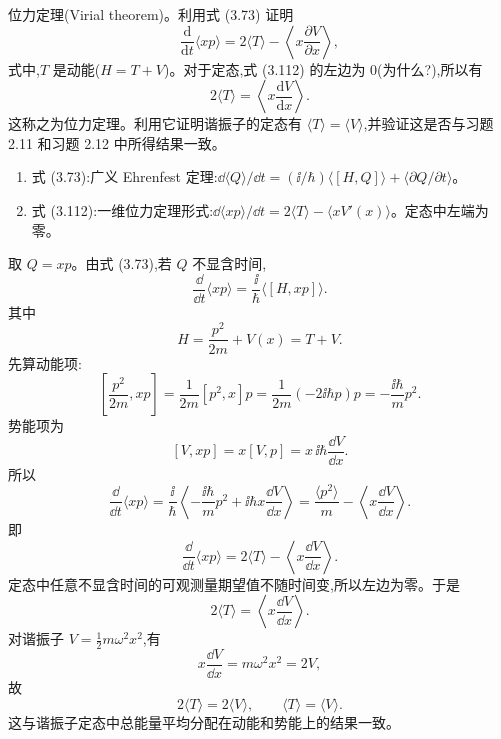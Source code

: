 \begin{question}
位力定理(Virial theorem)。利用式 (3.73) 证明
\[
\frac{\mathrm d}{\mathrm dt}\langle xp\rangle=2\langle T\rangle-\left\langle x\frac{\partial V}{\partial x}\right\rangle,
\tag{3.112}
\]
式中,$T$ 是动能($H=T+V$)。对于定态,式 (3.112) 的左边为 0(为什么?),所以有
\[
2\langle T\rangle=\left\langle x\frac{\mathrm dV}{\mathrm dx}\right\rangle .
\tag{3.113}
\]
这称之为位力定理。利用它证明谐振子的定态有 $\langle T\rangle=\langle V\rangle$,并验证这是否与习题 2.11 和习题 2.12 中所得结果一致。

\par\smallskip
{}
\begin{enumerate}[leftmargin=2.2em,itemsep=0.12em,topsep=0.12em,parsep=0pt]
\item 式 (3.73):广义 Ehrenfest 定理:$\dd\langle Q\rangle/\dd t=(\ii/\hbar)\langle[H,Q]\rangle+\langle\partial Q/\partial t\rangle$。
\item 式 (3.112):一维位力定理形式:$\dd\langle xp\rangle/\dd t=2\langle T\rangle-\langle xV'(x)\rangle$。定态中左端为零。
\end{enumerate}

\end{question}
\begin{solution}
取 $Q=xp$。由式 (3.73),若 $Q$ 不显含时间,
\[
\frac{\dd}{\dd t}\langle xp\rangle=\frac{\ii}{\hbar}\langle[H,xp]\rangle.
\]
其中
\[
H=\frac{p^2}{2m}+V(x)=T+V.
\]
先算动能项:
\[
\left[\frac{p^2}{2m},xp\right]
=\frac1{2m}[p^2,x]p
=\frac1{2m}(-2\ii\hbar p)p
=-\frac{\ii\hbar}{m}p^2.
\]
势能项为
\[
[V,xp]=x[V,p]=x\,\ii\hbar\frac{\dd V}{\dd x}.
\]
所以
\[
\frac{\dd}{\dd t}\langle xp\rangle
=\frac{\ii}{\hbar}\left\langle-\frac{\ii\hbar}{m}p^2
+\ii\hbar x\frac{\dd V}{\dd x}\right\rangle
=\frac{\langle p^2\rangle}{m}-\left\langle x\frac{\dd V}{\dd x}\right\rangle.
\]
即
\[
\boxed{\frac{\dd}{\dd t}\langle xp\rangle=2\langle T\rangle-\left\langle x\frac{\dd V}{\dd x}\right\rangle.}
\]
定态中任意不显含时间的可观测量期望值不随时间变,所以左边为零。于是
\[
2\langle T\rangle=\left\langle x\frac{\dd V}{\dd x}\right\rangle.
\]
对谐振子 $V=\frac12m\omega^2x^2$,有
\[
x\frac{\dd V}{\dd x}=m\omega^2x^2=2V,
\]
故
\[
2\langle T\rangle=2\langle V\rangle,
\qquad
\boxed{\langle T\rangle=\langle V\rangle.}
\]
这与谐振子定态中总能量平均分配在动能和势能上的结果一致。
\end{solution}

